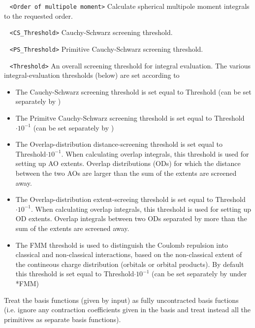 \begin{description}
\verb| | \newline
\verb|<Order of multipole moment>|\newline
Calculate spherical multipole moment integrals to the requested order.
\item[\Key{THR\_CS}] 
\verb| | \newline
\verb|<CS_Threshold>|\newline
Cauchy-Schwarz screening threshold.
\item[\Key{THR\_PS}] 
\verb| | \newline
\verb|<PS_Threshold>|\newline
Primitive Cauchy-Schwarz screening threshold.
\item[\Key{THRESH}]
\verb| | \newline
\verb|<Threshold>|\newline
An overall screening threshold for integral evaluation. The various integral-evaluation thresholds (below) are set according to
\begin{itemize}
\item The Cauchy-Schwarz screening threshold is set equal to Threshold (can be set separately by )
\item The Primitve Cauchy-Schwarz screening threshold is set equal to Threshold$\cdot 10^{-1}$  (can be set separately by )
\item The Overlap-distribution distance-screening threshold is set equal to 
      Threshold$\cdot 10^{-1}$.
      When calculating overlap integrals, this threshold 
      is used for setting up AO extents. Overlap distributions (ODs) for which the 
      distance between the two AOs are larger than the sum of the extents are 
      screened away.
\item The Overlap-distribution extent-screeing threshold is set equal to 
      Threshold$\cdot 10^{-1}$. When calculating overlap integrals, this threshold 
      is used for setting up OD extents. Overlap integrals between two ODs separated
      by more than the sum of the extents are screened away. 
\item The FMM threshold is used to distinguish the Coulomb repulsion into classical and non-classical interactions, based on
      the non-classical extent of the contineous charge distribution (orbitals or orbital products). By default this threshold 
      is set equal to Threshold$\cdot 10^{-1}$ (can be set separately by  under *FMM)
\end{itemize}
\item[\Key{UNCONT}] Treat the basis functions (given by input) as fully uncontracted basis fuctions (i.e. ignore
any contraction coefficients given in the basis and treat instead all the primitives as separate basis functions).
\end{description}

